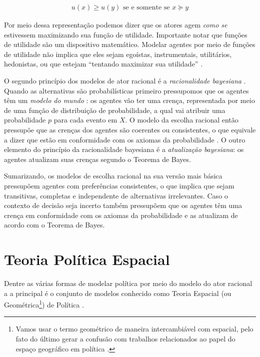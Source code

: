 \begin{align*}
  u(x) \geq u(y)
  \text{ se e somente se }
  x \succeq y
\end{align*}

Por meio dessa representação podemos dizer que os atores agem \textit{como se}
estivessem maximizando sua função de utilidade. Importante notar que funções de
utilidade são um dispositivo matemático. Modelar agentes por meio de funções de
utilidade não implica que eles sejam egoístas, instrumentais, utilitários,
hedonistas, ou que estejam ``tentando maximizar sua utilidade''
\cite{gaus2007philosophy}.

O segundo princípio dos modelos de ator racional é a \textit{racionalidade
  bayesiana} \cite{gintis2016individuality}. Quando as alternativas são
probabilísticas primeiro pressupomos que os agentes têm um \textit{modelo do
  mundo} \cite{acemoglu2011opinion}: os agentes vão ter uma crença, representada
por meio de uma função de distribuição de probabilidade, a qual vai atribuir uma
probabilidade \(p\) para cada evento em \(X\). O modelo da escolha racional
então pressupõe que as crenças dos agentes são coerentes ou consistentes, o que
equivale a dizer que estão em conformidade com os axiomas da probabilidade
\cite{jackman2009bayesian}. O outro elemento do princípio da racionalidade
bayesiana é a \textit{atualização
  bayesiana}\cite[p.104]{gintis2016individuality}: os agentes atualizam suas
crenças segundo o Teorema de Bayes.

Sumarizando, os modelos de escolha racional na sua versão mais básica pressupõem
agentes com preferências consistentes, o que implica que sejam transitivas,
completas e independente de alternativas irrelevantes. Caso o contexto de
decisão seja incerto também pressupõem que os agentes têm uma crença em
conformidade com os axiomas da probabilidade  e as atualizam de acordo com o
Teorema de Bayes.


\section{Teoria Política Espacial}

Dentre as várias formas de modelar política por meio do modelo do ator racional
a a principal é o conjunto de modelos conhecido como Teoria Espacial (ou
Geométrica\footnote{Vamos usar o termo geométrico de maneira intercambiável com
  espacial, pelo fato do último gerar a confusão com trabalhos relacionados ao
  papel do espaço geográfico em política \cite{ward2002spatial,
    poole2005spatial}.}) de Política \cite{van2005political}.

